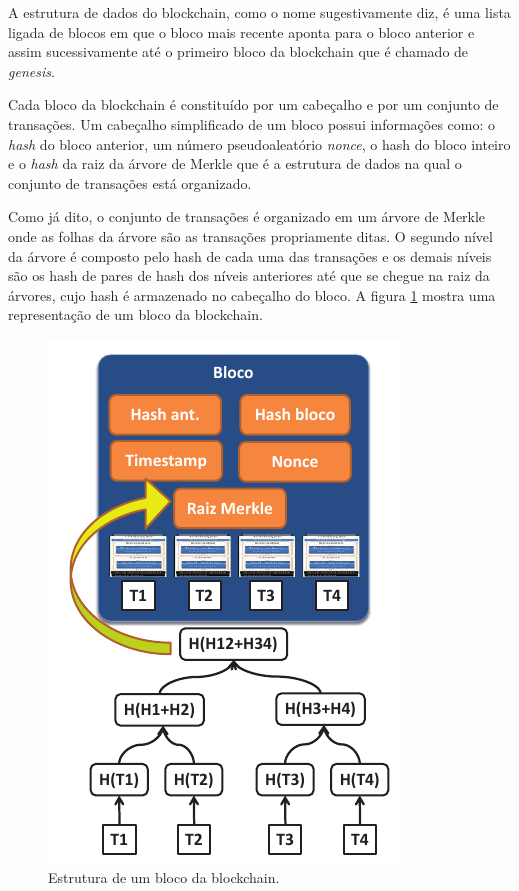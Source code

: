 \documentclass[12pt]{article}
\begin{document}
A estrutura de dados do blockchain, como o nome sugestivamente diz, é uma lista ligada de blocos em que o bloco mais recente aponta para o bloco anterior e assim sucessivamente até o primeiro bloco da blockchain que é chamado de \emph{genesis}.

Cada bloco da blockchain é constituído por um cabeçalho e por um conjunto de transações. Um cabeçalho simplificado de um bloco possui informações como: o \emph{hash} do bloco anterior, um número pseudoaleatório \emph{nonce}, o hash do bloco inteiro e o \emph{hash} da raiz da árvore de Merkle que é a estrutura de dados na qual o conjunto de transações está organizado.

Como já dito, o conjunto de transações é organizado em um árvore de Merkle onde as folhas da árvore são as transações propriamente ditas. O segundo nível da árvore é composto pelo hash de cada uma das transações e os demais níveis são os hash de pares de hash dos níveis anteriores até que se chegue na raiz da árvores, cujo hash é armazenado no cabeçalho do bloco. A figura \ref{fig:estrutura_blockchain} mostra uma representação de um bloco da blockchain.

\begin{figure}[H]
    \centering
    \includegraphics[scale=0.4]{Imagens/estrutura_blockchain.png}
    \caption{Estrutura de um bloco da blockchain.}
    \label{fig:estrutura_blockchain}
\end{figure}
\end{document}
